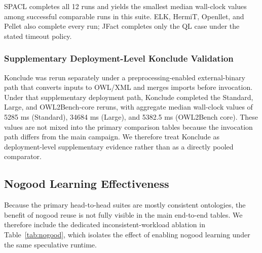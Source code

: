 \documentclass[preprint,12pt,times]{elsarticle}
\begin{document}
SPACL completes all 12 runs and yields the smallest median wall-clock values among successful comparable runs in this suite. ELK, HermiT, Openllet, and Pellet also complete every run; JFact completes only the QL case under the stated timeout policy.

\subsubsection{Supplementary Deployment-Level Konclude Validation}
\label{sec:konclude-supplement}

Konclude was rerun separately under a preprocessing-enabled external-binary path that converts inputs to OWL/XML and merges imports before invocation. Under that supplementary deployment path, Konclude completed the Standard, Large, and OWL2Bench-core reruns, with aggregate median wall-clock values of 5285 ms (Standard), 34684 ms (Large), and 5382.5 ms (OWL2Bench core). These values are not mixed into the primary comparison tables because the invocation path differs from the main campaign. We therefore treat Konclude as deployment-level supplementary evidence rather than as a directly pooled comparator.

\subsection{Nogood Learning Effectiveness}
\label{sec:nogood-eval}

Because the primary head-to-head suites are mostly consistent ontologies, the benefit of nogood reuse is not fully visible in the main end-to-end tables. We therefore include the dedicated inconsistent-workload ablation in Table~\ref{tab:nogood}, which isolates the effect of enabling nogood learning under the same speculative runtime.

\begin{table}[htbp]
\centering
\caption{Nogood Learning Effectiveness (mean $\pm$ std, $n=50$)}
\label{tab:nogood}
\end{table}
\end{document}
